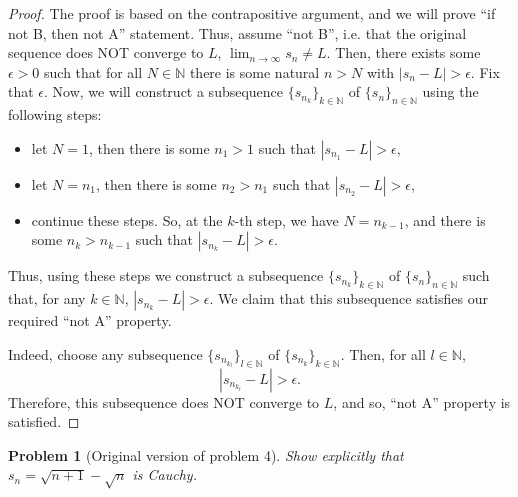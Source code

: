 \documentclass[11pt]{article}
\theoremstyle{plain}
\newtheorem{problem}{Problem}
\theoremstyle{remark}
\begin{document}
\begin{proof}
	The proof is based on the contrapositive argument, and we will prove ``if not B, then not A'' statement. Thus, assume ``not B'', i.e. that the original sequence does NOT converge to $L$, 
	$\displaystyle{\lim_{n \to \infty}} s_n \neq L$.
	Then, there exists some $\epsilon >0$ such that for all $N \in \mathbb{N}$ there is some natural $n > N$ with $|s_n - L| > \epsilon$. Fix that $\epsilon$. Now, we will construct a subsequence $\{s_{n_k}\}_{k \in \mathbb{N}}$ of $\{s_n\}_{n \in \mathbb{N}}$ using the following steps:
	\begin{itemize}
		\item let $N=1$, then there is some $n_1 > 1$ such that 
		$|s_{n_1} - L|>\epsilon$,
		\item let $N=n_1$, then there is some $n_2 > n_1$ such that 
		$|s_{n_2} - L|>\epsilon$,
		\item continue these steps. So, at the $k$-th step, we have $N=n_{k-1}$, and there is some $n_k > n_{k-1}$ such that 
		$|s_{n_k} - L|>\epsilon$.
	\end{itemize}
	Thus, using these steps we construct a subsequence $\{s_{n_k}\}_{k \in \mathbb{N}}$ of $\{s_n\}_{n \in \mathbb{N}}$ such that, for any $k \in \mathbb{N}$, $|s_{n_k} - L|>\epsilon$. We claim that this subsequence satisfies our required ``not A'' property. 
	
	Indeed, choose any subsequence $\{s_{n_{k_l}}\}_{l \in \mathbb{N}}$ of $\{s_{n_k}\}_{k \in \mathbb{N}}$. Then, for all $l \in \mathbb{N}$, 
	$$
	|s_{n_{k_l}} - L|>\epsilon.
	$$
	Therefore, this subsequence does NOT converge to $L$, and so, ``not A'' property is satisfied.
	
\end{proof}

 
 \begin{problem}[Original version of problem 4]
 	Show explicitly that $s_n=\sqrt{n+1}-\sqrt{n}$ is Cauchy.
 \end{problem}
 
\end{document}
